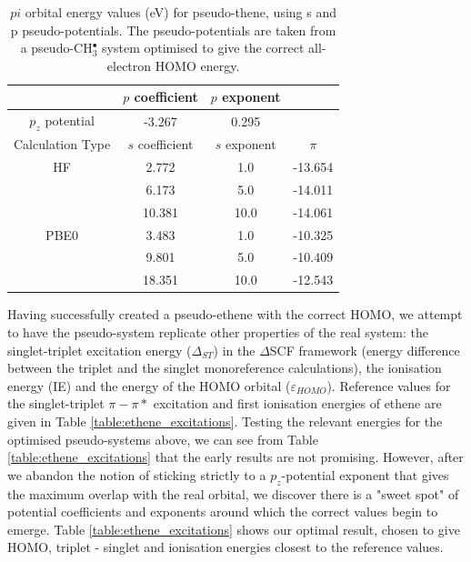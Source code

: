 \documentclass[journal=jctcce,manuscript=article]{achemso}
\begin{document}
\begin{table}[ht]
\caption{\(pi\) orbital energy values (eV) for pseudo-thene, using s and p pseudo-potentials. The pseudo-potentials are taken from a pseudo-CH\(^{\bullet}_{3}\) system optimised to give the correct all-electron HOMO energy.}
\begin{tabular}{c c c c}
\hline
& \(p\) coefficient & \(p\) exponent \\
\hline
\(p_{z}\) potential & -3.267 & 0.295 \\
\hline
Calculation Type & \(s\) coefficient & \(s\) exponent & \(\pi\) \\
\hline
HF & 2.772 & 1.0 & -13.654 \\
 & 6.173 & 5.0 & -14.011 \\
 & 10.381 & 10.0 & -14.061 \\
\hline
PBE0 & 3.483 & 1.0 & -10.325 \\
 & 9.801 & 5.0 & -10.409 \\
 & 18.351 & 10.0 & -12.543 \\
\hline
\end{tabular}
\label{table:p_potentials}
\end{table}

Having successfully created a pseudo-ethene with the correct HOMO, we attempt to have the pseudo-system replicate other properties of the real system:
the singlet-triplet excitation energy ($\Delta_{ST}$) in the $\Delta$SCF framework (energy difference between the triplet and the singlet monoreference
calculations), the ionisation energy (IE) and the energy of the HOMO orbital ($\varepsilon_{HOMO}$). Reference values for the singlet-triplet \(\pi-\pi*\) excitation and first ionisation energies of ethene are given in Table \ref{table:ethene_excitations}. Testing the relevant energies for the optimised pseudo-systems above, we can see from Table \ref{table:ethene_excitations} that the early results are not promising. However, after we abandon the notion of sticking strictly to a \(p_{z}\)-potential exponent that gives the maximum overlap with the real orbital, we discover there is a "sweet spot" of potential coefficients and exponents around which the correct values begin to emerge. Table \ref{table:ethene_excitations} shows our optimal result, chosen to give HOMO, triplet - singlet and ionisation energies closest to the reference values. 
\end{document}

